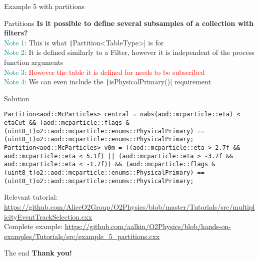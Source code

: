 \documentclass[10pt,lualatex,xcolor={table,svgnames},{hyperref={bookmarks=true,linktoc=all}},aspectratio=169]{beamer}
\newcommand{\programmatic}[1]{\textcolor{-green!40!yellow}{#1}}
\newcommand{\notion}[1]{\textcolor{teal}{#1}}
\newcommand{\codeline}[1]{{\texttt|#1|}}
\begin{document}
\begin{frame}{Example 5 with partitions}
    \begin{block}{Partitions}
\textbf{Is it possible to define several subsamples of a collection with filters?}\\

\notion{Note 1}: This is what \codeline{Partition<TableType>} is for \\
\notion{Note 2}: It is defined similarly to a \programmatic{Filter}, however it is independent of the process function arguments \\
\notion{Note 3}: \textcolor{red}{However the table it is defined for needs to be subscribed} \\
\notion{Note 4}: We can even include the \codeline{isPhysicalPrimary()} requirement \\
    \end{block}

\begin{block}{Solution}
\begin{verbatim}
Partition<aod::McParticles> central = nabs(aod::mcparticle::eta) < etaCut && (aod::mcparticle::flags & (uint8_t)o2::aod::mcparticle::enums::PhysicalPrimary) == (uint8_t)o2::aod::mcparticle::enums::PhysicalPrimary;
Partition<aod::McParticles> v0m = ((aod::mcparticle::eta > 2.7f && aod::mcparticle::eta < 5.1f) || (aod::mcparticle::eta > -3.7f && aod::mcparticle::eta < -1.7f)) && (aod::mcparticle::flags & (uint8_t)o2::aod::mcparticle::enums::PhysicalPrimary) == (uint8_t)o2::aod::mcparticle::enums::PhysicalPrimary;
\end{verbatim}
\end{block}

{\footnotesize Relevant tutorial:  \href{https://github.com/AliceO2Group/O2Physics/blob/master/Tutorials/src/multiplicityEventTrackSelection.cxx}{https://github.com/AliceO2Group/O2Physics/blob/master/Tutorials/src/multiplicityEventTrackSelection.cxx} \\
    Complete example: \href{https://github.com/aalkin/O2Physics/blob/hands-on-examples/Tutorials/src/example_5_partitions.cxx}{https://github.com/aalkin/O2Physics/blob/hands-on-examples/Tutorials/src/example\_5\_partitions.cxx}
}
\end{frame}

\begin{frame}{The end}
    \vspace{0.15\textheight}
    \centering
    \Huge
    \textbf{Thank you!}
\end{frame}
\end{document}
